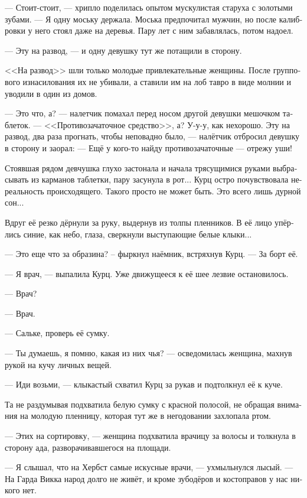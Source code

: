 \documentclass[a4paper,12pt,fleqn]{book}\usepackage{cooltooltips}\usepackage{polyglossia}\setdefaultlanguage[babelshorthands=true]{russian}\setotherlanguage{english}\defaultfontfeatures{Ligatures=TeX,Mapping=tex-text} \usepackage{xcolor}\definecolor{lightgray}{HTML}{bbbbbb}\color{lightgray}\newcommand{\ml}[3]{\textenglish{\textcolor{black}{#3}}}
\begin{document}
--- Стоит-стоит, --- хрипло поделилась опытом мускулистая старуха с золотыми зубами.
--- Я одну моську держала.
Моська предпочитал мужчин, но после калибровки у него стоял даже на деревья.
Пару лет с ним забавлялась, потом надоел.

--- Эту на развод, --- и одну девушку тут же потащили в сторону.

<<На развод>> шли только молодые привлекательные женщины.
После группового изнасилования их не убивали, а ставили им на лоб тавро в виде молнии и уводили в один из домов.

--- Это что, а? --- налетчик помахал перед носом другой девушки мешочком таблеток.
--- <<Противозачаточное средство>>, а?
У-у-у, как нехорошо.
Эту на развод, два раза прогнать, чтобы неповадно было, --- налётчик отбросил девушку в сторону и заорал:
--- Ещё у кого-то найду противозачаточные --- отрежу уши!

Стоявшая рядом девчушка глухо застонала и начала трясущимися руками выбрасывать из карманов таблетки, пару засунула в рот...
Курц остро почувствовала нереальность происходящего.
Такого просто не может быть.
Это всего лишь дурной сон...

Вдруг её резко дёрнули за руку, выдернув из толпы пленников.
В её лицо упёрлись синие, как небо, глаза, сверкнули выступающие белые клыки...

--- Это еще что за образина? -- фыркнул наёмник, встряхнув Курц.
--- За борт её.

--- Я врач, --- выпалила Курц.
Уже движущееся к её шее лезвие остановилось.

--- Врач?

--- Врач.

--- Сальке, проверь её сумку.

--- Ты думаешь, я помню, какая из них чья? --- осведомилась женщина, махнув рукой на кучу личных вещей.

--- Иди возьми, --- клыкастый схватил Курц за рукав и подтолкнул её к куче.

Та не раздумывая подхватила белую сумку с красной полосой, не обращая внимания на молодую пленницу, которая тут же в негодовании захлопала ртом.

--- Этих на сортировку, --- женщина подхватила врачицу за волосы и толкнула в сторону ада, разворачивавшегося на площади.

--- Я слышал, что на Хербст самые искусные врачи, --- ухмыльнулся лысый.
--- На Гарда Викка народ долго не живёт, и кроме зубодёров и костоправов у нас никого нет.
\end{document}
